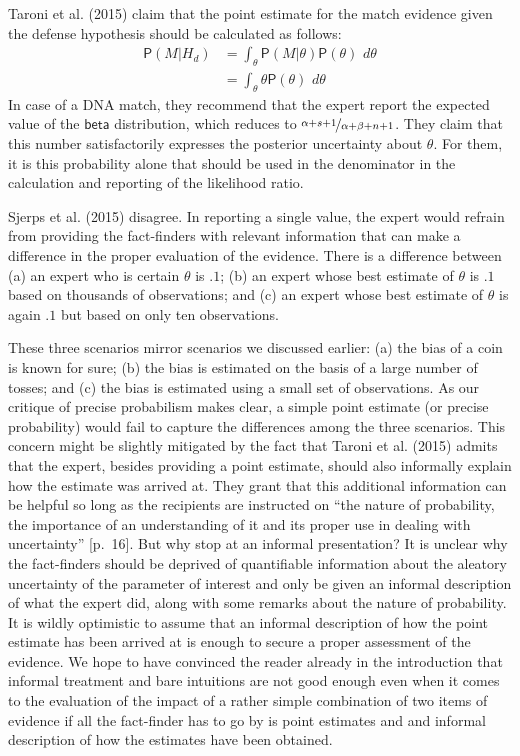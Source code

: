 \documentclass[
  10pt,
  dvipsnames,enabledeprecatedfontcommands]{scrartcl}
\newcommand{\pr}[1]{\mathsf{P}(#1)}
\newcommand{\s}[1]{\mbox{$\mathsf{#1}$}}
\begin{document}
Taroni et al. (2015) claim that the point estimate for the match
evidence given the defense hypothesis should be calculated as follows:
\begin{align*}\pr{M \vert H_d} & = \int_{\theta} \pr{M\vert \theta} \pr{\theta}\,\, d\theta \\
& =  \int_\theta  \theta \pr{\theta}\,\, d\theta
\end{align*} In case of a DNA match, they recommend that the expert
report the expected value of the \(\s{beta}\) distribution, which
reduces to \(\nicefrac{\alpha + s + 1}{\alpha + \beta +n + 1}\). They
claim that this number satisfactorily expresses the posterior
uncertainty about \(\theta\). For them, it is this probability alone
that should be used in the denominator in the calculation and reporting
of the likelihood ratio.

Sjerps et al. (2015) disagree. In reporting a single value, the expert
would refrain from providing the fact-finders with relevant information
that can make a difference in the proper evaluation of the evidence.
There is a difference between (a) an expert who is certain \(\theta\) is
\(.1\); (b) an expert whose best estimate of \(\theta\) is \(.1\) based
on thousands of observations; and (c) an expert whose best estimate of
\(\theta\) is again \(.1\) but based on only ten observations.

These three scenarios mirror scenarios we discussed earlier: (a) the
bias of a coin is known for sure; (b) the bias is estimated on the basis
of a large number of tosses; and (c) the bias is estimated using a small
set of observations. As our critique of precise probabilism makes clear,
a simple point estimate (or precise probability) would fail to capture
the differences among the three scenarios. This concern might be
slightly mitigated by the fact that Taroni et al. (2015) admits that the
expert, besides providing a point estimate, should also informally
explain how the estimate was arrived at. They grant that this additional
information can be helpful so long as the recipients are instructed on
``the nature of probability, the importance of an understanding of it
and its proper use in dealing with uncertainty'' {[}p.~16{]}. But why
stop at an informal presentation? It is unclear why the fact-finders
should be deprived of quantifiable information about the aleatory
uncertainty of the parameter of interest and only be given an informal
description of what the expert did, along with some remarks about the
nature of probability. It is wildly optimistic to assume that an
informal description of how the point estimate has been arrived at is
enough to secure a proper assessment of the evidence. We hope to have
convinced the reader already in the introduction that informal treatment
and bare intuitions are not good enough even when it comes to the
evaluation of the impact of a rather simple combination of two items of
evidence if all the fact-finder has to go by is point estimates and and
informal description of how the estimates have been obtained.
\end{document}
